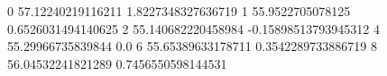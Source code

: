 0 57.12240219116211 1.8227348327636719
1 55.9522705078125 0.6526031494140625
2 55.140682220458984 -0.15898513793945312
4 55.29966735839844 0.0
6 55.65389633178711 0.3542289733886719
8 56.04532241821289 0.7456550598144531
